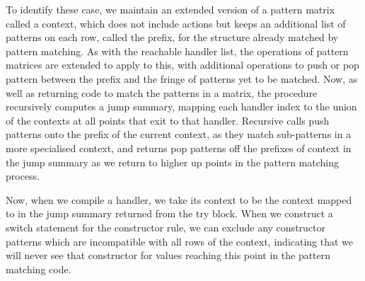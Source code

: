 To identify these case, we maintain an extended version of a pattern matrix called a context, which does not include actions but keeps an additional list of patterns on each row, called the prefix, for the structure already matched by pattern matching. As with the reachable handler list, the operations of pattern matrices are extended to apply to this, with additional operations to push or pop pattern between the prefix and the fringe of patterns yet to be matched. Now, as well as returning code to match the patterns in a matrix, the procedure recursively computes a jump summary, mapping each handler index to the union of the contexts at all points that exit to that handler. Recursive calls push patterns onto the prefix of the current context, as they match sub-patterns in a more specialised context, and returns pop patterns off the prefixes of context in the jump summary as we return to higher up points in the pattern matching process. 

Now, when we compile a handler, we take its context to be the context mapped to in the jump summary returned from the try block. When we construct a switch statement for the constructor rule, we can exclude any constructor patterns which are incompatible with all rows of the context, indicating that we will never see that constructor for values reaching this point in the pattern matching code. \\

